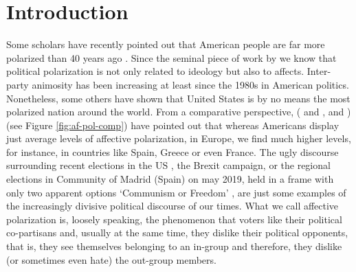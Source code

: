 \documentclass[a4paper, svgnames]{article}
\begin{document}







\vfill
\newpage %
\thispagestyle{empty}
\mbox{}
\newpage

\tableofcontents

\newpage %
\thispagestyle{empty}
\mbox{}

\newpage
\listoffigures

\newpage %
\thispagestyle{empty}
\mbox{}


\listoftables

\newpage %
\thispagestyle{empty}
\mbox{}

\clearpage
{}

\section{Introduction}

Some scholars have recently pointed out that American people are far more polarized than 40 years ago \citep{Lelkes2018}. Since the seminal piece of work by \cite{Iyengar2012} we know that political polarization is not only related to ideology but also to affects. Inter-party animosity has been increasing at least since the 1980s in American politics. Nonetheless, some others have shown that United States is by no means the most polarized nation around the world. From a comparative perspective, (\citeauthor{Gidron2018} \citeyear{Gidron2018} and \citeyear{Gidron2019}, and \cite{WESTWOOD2018}) (see Figure \ref{fig:af-pol-comp}) have pointed out that whereas Americans display just average levels of affective polarization, in Europe, we find much higher levels, for instance, in countries like Spain, Greece or even France. The ugly discourse surrounding recent elections in the US \citep*{AmericaUglyElection}, the Brexit campaign, or the regional elections in Community of Madrid (Spain) on may 2019, held in a frame with only two apparent options `Communism or Freedom' \citep*{elconfindencialComunismoLibertadIsabel2021}, are just some examples of the increasingly divisive political discourse of our times. What we call affective polarization is, loosely speaking, the phenomenon that voters like their political co-partisans and, usually at the same time, they dislike their political opponents, that is, they see themselves belonging to an in-group and therefore, they dislike (or sometimes even hate) the out-group members.
\end{document}
